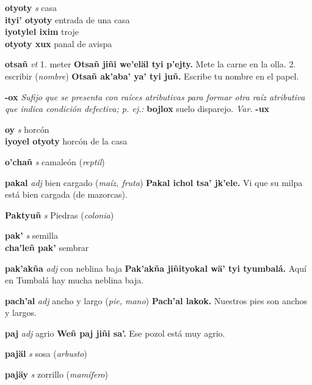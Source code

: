 \documentclass[10pt]{scrbook}
\newcommand{\entry}[1]{\textbf{#1}}
\newcommand{\alphaletter}[1]{\end{multicols}\addsec{#1}\begin{multicols}{2}}
\newcommand{\onedefinition}[1]{#1.}
\newcommand{\nontranslationdef}[1]{\textit{#1}}
\newcommand{\partofspeech}[1]{\textit{#1}}
\newcommand{\spanishtranslation}[1]{#1}
\newcommand{\clarification}[1]{(\textit{#1})}
\newcommand{\cholexample}[1]{\textbf{#1}}
\newcommand{\exampletranslation}[1]{#1}
\newcommand{\secondaryentry}[1]{\\\textbf{#1}}
\newcommand{\secondtranslation}[1]{#1}
\newcommand{\variation}[1]{\textit{Var.} \textbf{#1}}
\begin{document}
\begin{multicols}{2}
\entry{otyoty}
\partofspeech{s}
\spanishtranslation{casa}
\secondaryentry{ityi' otyoty}
\secondtranslation{entrada de una casa}
\secondaryentry{iyotylel ixim}
\secondtranslation{troje}
\secondaryentry{otyoty xux}
\secondtranslation{panal de avispa}

\entry{otsañ}
\partofspeech{vt}
\onedefinition{1}
\spanishtranslation{meter}
\cholexample{Otsañ jiñi we'eläl tyi p'ejty.}
\exampletranslation{Mete la carne en la olla.}
\onedefinition{2}
\spanishtranslation{escribir}
\clarification{nombre}
\cholexample{Otsañ ak'aba' ya' tyi juñ.}
\exampletranslation{Escribe tu nombre en el papel.}

\entry{-ox}
\nontranslationdef{Sufijo que se presenta con raíces atributivas para formar otra raíz atributiva que indica condición defectiva; p. ej.:}
\cholexample{bojlox}
\exampletranslation{suelo disparejo.}
\variation{-ux}

\entry{oy}
\partofspeech{s}
\spanishtranslation{horcón}
\secondaryentry{iyoyel otyoty}
\secondtranslation{horcón de la casa}

\entry{o'chañ}
\partofspeech{s}
\spanishtranslation{camaleón}
\clarification{reptil}

\alphaletter{P}

\entry{pakal}
\partofspeech{adj}
\spanishtranslation{bien cargado}
\clarification{maíz, fruta}
\cholexample{Pakal ichol tsa' jk'ele.}
\exampletranslation{Vi que su milpa está bien cargada (de mazorcas).}

\entry{Paktyuñ}
\partofspeech{s}
\spanishtranslation{Piedras}
\clarification{colonia}

\entry{pak'}
\partofspeech{s}
\spanishtranslation{semilla}
\secondaryentry{cha'leñ pak'}
\secondtranslation{sembrar}

\entry{pak'akña}
\partofspeech{adj}
\spanishtranslation{con neblina baja}
\cholexample{Pak'akña jiñityokal wä' tyi tyumbalá.}
\exampletranslation{Aquí en Tumbalá hay mucha neblina baja.}

\entry{pach'al}
\partofspeech{adj}
\spanishtranslation{ancho y largo}
\clarification{pie, mano}
\cholexample{Pach'al lakok.}
\exampletranslation{Nuestros pies son anchos y largos.}

\entry{paj}
\partofspeech{adj}
\spanishtranslation{agrio}
\cholexample{Weñ paj jiñi sa'.}
\exampletranslation{Ese pozol está muy agrio.}

\entry{pajäl}
\partofspeech{s}
\spanishtranslation{sosa}
\clarification{arbusto}

\entry{pajäy}
\partofspeech{s}
\spanishtranslation{zorrillo}
\clarification{mamífero}


\end{multicols}
\end{document}
